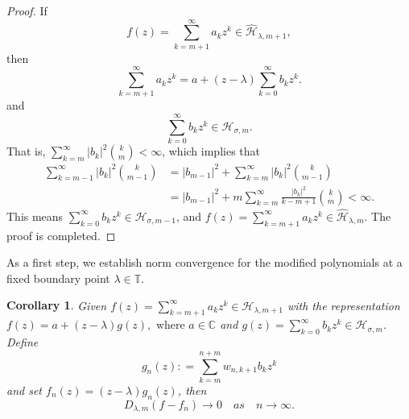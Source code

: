 \documentclass[12pt,reqno]{amsart}
\newtheorem{corollary}[theorem]{Corollary}
\begin{document}
\begin{proof}
If
\begin{equation*}
f(z) = \sum\limits_{k = m+1}^\infty  a_k z^k \in \widehat{\mathcal{H}}_{\lambda ,m+1},
\end{equation*}
then
\begin{equation*}
\sum\limits_{k = m+1}^\infty a_k z^k = a + (z - \lambda) \sum\limits_{k = 0}^\infty b_k z^k.
\end{equation*}
and
\begin{equation*}
\sum\limits_{k = 0}^\infty b_k z^k \in \mathcal{H}_{\sigma ,m}.
\end{equation*}
That is, $\sum\limits_{k = m}^{\infty} \left| b_k \right|^2 \binom{k}{m} < \infty $, which implies that
\begin{align*}
\sum_{k = m - 1}^{\infty} \left| b_k \right|^2 \binom{k}{m - 1}&= \left| b_{m - 1} \right|^2 + \sum_{k = m}^{\infty} \left| b_k \right|^2 \binom{k}{m - 1} \\
&= \left| b_{m - 1} \right|^2 + m\sum_{k = m}^{\infty} \frac{{{{\left| {{b_k}} \right|}^2}}}{{k - m + 1}} \binom{k}{m} < \infty.
\end{align*}
This means $\sum\limits_{k = 0}^\infty b_k z^k \in \mathcal{H}_{\sigma ,m-1}$, and $f(z) = \sum\limits_{k = m+1}^\infty  a_k z^k \in \widehat{\mathcal{H}}_{\lambda ,m}.$ The proof is completed.
\end{proof}

As a first step, we establish norm convergence for the modified polynomials at a fixed boundary point $\lambda\in\mathbb{T}$.

\begin{corollary}\label{co4.5}
Given $f(z) = \sum\limits_{k = m + 1}^\infty  {{a_k}{z^k}} \in \widehat{\mathcal{H}}_{\lambda, m+1}$ with the representation $f(z) = a + (z - \lambda) g(z), \text{~where~}  a\in\mathbb{C}$ and $g(z) = \sum\limits_{k=0}^{\infty} b_k z^k \in \mathcal{H}_{\sigma, m}$. Define
\begin{equation}
 {g_n}(z): = \sum\limits_{k = m}^{n + m} {{w_{n,k + 1}}} {b_k}{z^k} \tag{3.5}
 \end{equation}
 and set $ f_n(z) = (z - \lambda) g_n(z) $, then
$${D_{\lambda ,m}}(f - {f_n}) \to 0 \quad as \quad n \to \infty.$$
\end{corollary}
\end{document}
